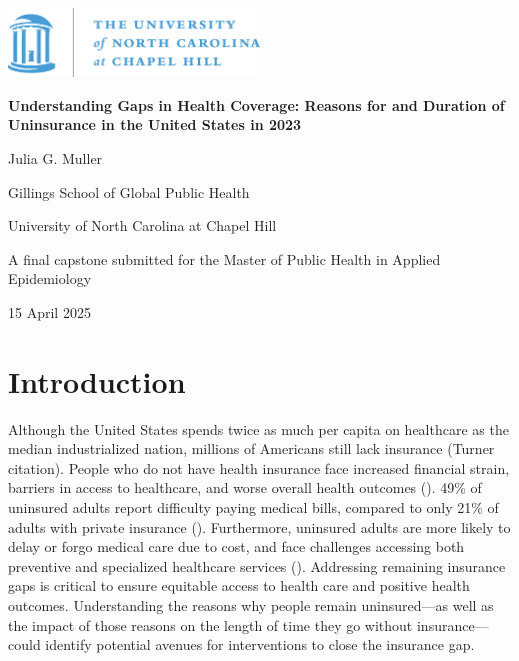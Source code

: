 \documentclass[12pt]{article}
\newcommand{\documentgeometry}{\newgeometry{top=1in, bottom=1in, left=1in, right=1in}}
\begin{document}
\begin{titlepage}
    \centering
    \vspace*{-3cm}
    \includegraphics[width=0.5\textwidth]{reports/unc-logo.png}\par
    \vspace{0.5cm}
    {\Huge\bfseries Understanding Gaps in Health Coverage: Reasons for and Duration of Uninsurance in the United States in 2023 \par}
    \vspace{2cm}
    {\LARGE Julia G. Muller\par}
    {\Large Gillings School of Global Public Health \par}
    {\Large University of North Carolina at Chapel Hill \par}
    \vspace{3cm}
    {\large A final capstone submitted for the Master of Public Health in Applied Epidemiology \par}
    \vspace{1cm}
    {\large 15 April 2025\par}
    \vspace{1cm}
\end{titlepage}


\newpage
\documentgeometry
\tableofcontents


\newpage
\section{Introduction}

Although the United States spends twice as much per capita on healthcare as the median industrialized nation, millions of Americans still lack insurance (Turner citation). People who do not have health insurance face increased financial strain, barriers in access to healthcare, and worse overall health outcomes (\cite{davis_uninsured_2007}). 49\% of uninsured adults report difficulty paying medical bills, compared to only 21\% of adults with private insurance (\cite{tolbert_key_2024}). Furthermore, uninsured adults are more likely to delay or forgo medical care due to cost, and face challenges accessing both preventive and specialized healthcare services (\cite{cha_reasons_2020, erly_characterization_2022}). Addressing remaining insurance gaps is critical to ensure equitable access to health care and positive health outcomes. Understanding the reasons why people remain uninsured—as well as the impact of those reasons on the length of time they go without insurance—could identify potential avenues for interventions to close the insurance gap.
\end{document}
